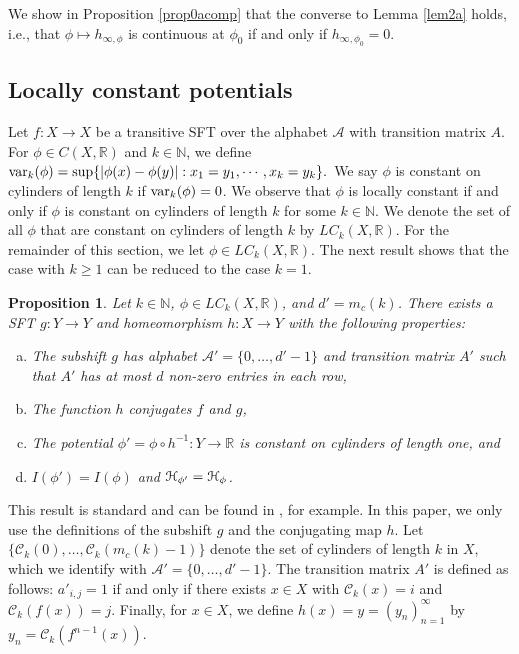 \documentclass[11pt, reqno]{amsart}
\newtheorem{proposition}[theorem]{Proposition}
\newcommand{\cH}{\EuScript{H}}
\newcommand{\bR}{{\mathbb R}}
\newcommand{\bN}{{\mathbb N}}
\newcommand{\cA}{{\mathcal A}}
\newcommand{\cC}{{\mathcal C}}
\def\var{{\rm var}}
\begin{document}
We show in Proposition \ref{prop0acomp} that the converse to Lemma \ref{lem2a} holds, i.e., that $\phi\mapsto h_{\infty,\phi}$ is continuous at $\phi_0$ if and only if $h_{\infty,\phi_0}=0$.





 \subsection{Locally constant potentials}

Let $f:X\to X$ be a transitive SFT over the alphabet $\cA$ with transition matrix $A$. For $\phi\in C(X,\bR)$ and  $k\in\bN$, we define $\var_k(\phi)=\sup\{|\phi(x)-\phi(y)|: x_1=y_1,\cdots, x_k=y_k\}.$
We say $\phi$ is constant on cylinders of length $k$ if $\var_k(\phi)=0$. We observe that $\phi$ is locally constant if and only if $\phi$ is constant on cylinders of length $k$ for some $k\in\bN$. We denote the set of all $\phi$ that are constant on cylinders of length $k$ by $LC_k(X,\bR)$.  For the remainder of this section, we let $\phi\in LC_k(X,\bR)$.
The next result shows that the case with $k\geq1$ can be reduced to the case $k=1$.

\begin{proposition}\label{propone}
 Let $k\in \bN$, $\phi\in LC_k(X,\bR)$, and  $d'=m_c(k)$. There exists a SFT $g:Y\to Y$ and homeomorphism $h:X\to Y$ with the following properties:
 \begin{enumerate}[(a)]
 \item The subshift $g$ has alphabet $\cA'=\{0,\dots,d'-1\}$ and transition matrix $A'$ such that $A'$ has at most $d$ non-zero entries in each row,
 \item The function $h$ conjugates $f$ and $g$, 
 \item The potential $\phi'=\phi\circ h^{-1}:Y\to \bR$  is constant on cylinders of length one, and
 \item $I(\phi')=I(\phi)$ and $\cH_{\phi'}=\cH_\phi$.
 \end{enumerate}
\end{proposition}

This result is  standard  and can be found in \cite{BSW}, for example.  In this paper, we only use the definitions of the subshift $g$ and the conjugating map $h$.  Let $\{\cC_k(0),\dots,\cC_k({m_c(k)-1})\}$ denote the set of cylinders of length $k$ in $X$, which we identify with $\cA'=\{0,\dots, d'-1\}$.  The transition matrix $A'$  is defined as follows: $a'_{i,j}=1$ if and only if there exists $x\in X$ with $\cC_k(x)=i$ and $\cC_k(f(x))=j$.   Finally, for $x\in X$, we define $h(x)=y=(y_n)_{n=1}^\infty$ by $y_n=\cC_k(f^{n-1}(x))$.
\end{document}
